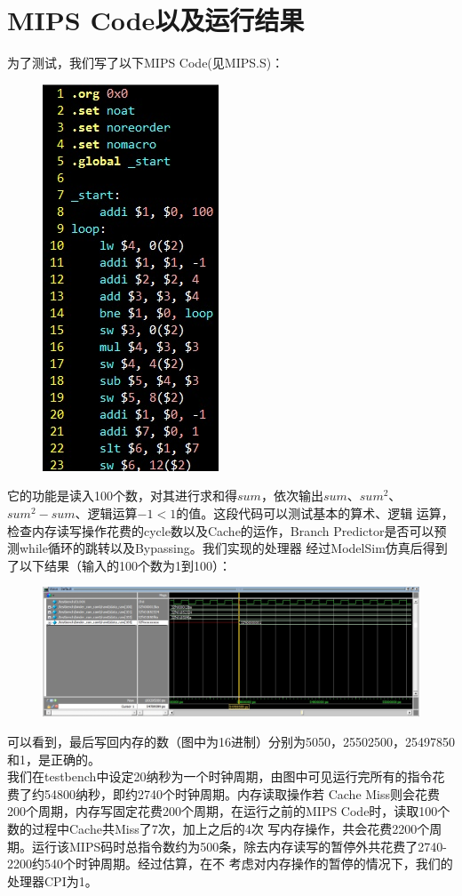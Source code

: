 \documentclass[titlepage]{article}
\begin{document}
\section{MIPS Code以及运行结果}
为了测试，我们写了以下MIPS Code(见MIPS.S)：
\begin{figure}[H]
\includegraphics[height=.4\textheight]{mips.JPG}
\end{figure}
它的功能是读入100个数，对其进行求和得$sum$，依次输出$sum$、$sum^2$、$sum^2-sum$、逻辑运算$-1<1$的值。这段代码可以测试基本的算术、逻辑
运算，检查内存读写操作花费的cycle数以及Cache的运作，Branch Predictor是否可以预测while循环的跳转以及Bypassing。我们实现的处理器
经过ModelSim仿真后得到了以下结果（输入的100个数为1到100）：
\begin{figure}[H]
\includegraphics[height=.3\textheight]{1.JPG}
\end{figure}
可以看到，最后写回内存的数（图中为16进制）分别为5050，25502500，25497850和1，是正确的。\\
\indent 我们在testbench中设定20纳秒为一个时钟周期，由图中可见运行完所有的指令花费了约54800纳秒，即约2740个时钟周期。内存读取操作若
Cache Miss则会花费200个周期，内存写固定花费200个周期，在运行之前的MIPS Code时，读取100个数的过程中Cache共Miss了7次，加上之后的4次
写内存操作，共会花费2200个周期。运行该MIPS码时总指令数约为500条，除去内存读写的暂停外共花费了2740-2200约540个时钟周期。经过估算，在不
考虑对内存操作的暂停的情况下，我们的处理器CPI为1。
\end{document}
